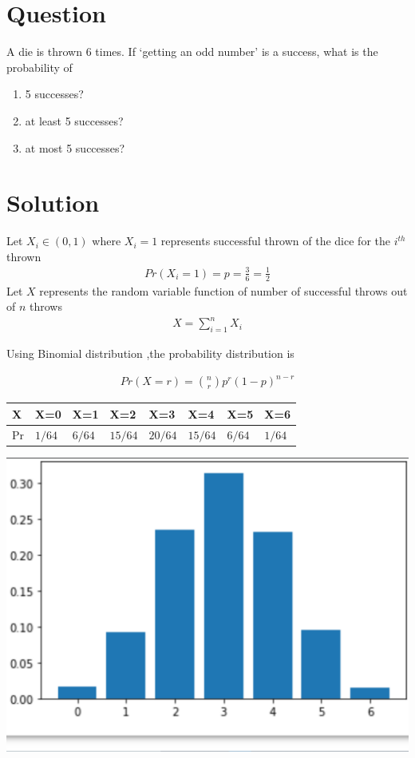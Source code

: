 \documentclass[journal,12pt,twocolumn]{IEEEtran}
\begin{document}
\section*{Question}
A die is thrown 6 times. If ‘getting an odd
number’ is a success, what is the probability
of
\begin{enumerate}
    \item 5 successes?
    \item at least 5 successes?
    \item at most 5 successes?
\end{enumerate}
\section*{Solution}
Let $X_{i}\in (0,1)$  where $X_{i}=1$ represents successful thrown of the dice for the $i^{th}$ thrown \\
\begin{align}
    Pr(X_{i}=1)=p=\frac{3}{6}=\frac{1}{2}
\end{align}
Let $X$ represents the random variable function of number of successful throws out of $n$ throws
\begin{align}
    X=\sum_{i=1}^n X_{i}
\end{align}

    Using Binomial distribution ,the probability distribution is 

\begin{align}
        Pr(X=r)= \binom{n}{r} p^{r}(1-p)^{n-r}
\end{align}

\begin{center}
\begin{tabular}{ | m{0.8em} | m{0.8cm}| m{0.8cm} |m{0.8cm} |m{0.8cm} |m{0.8cm}|m{0.8cm} |m{0.8cm}|} 
\hline
 X &   X=0 & X=1 &X=2&X=3 & X=4 & X=5& X=6 \\ 
\hline
\hline
 Pr &   $1/64$ & $6/64$ &$15/64 $ &$20/64$ & $15/64$ &$ 6/64$ & $1/64$ \\ 
\hline


\end{tabular}
\end{center}
\begin{center}
\includegraphics[scale=0.2]{images/Screenshot (184).png}
\end{center}
  
\end{document}
